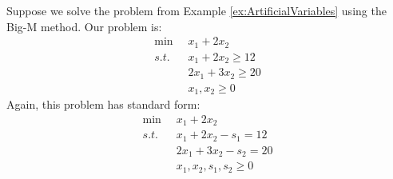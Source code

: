 \begin{example} 
Suppose we solve the problem from Example \ref{ex:ArtificialVariables} using the Big-M method. Our problem is:
\begin{equation}
\begin{aligned}
\min\;\; & 	x_1 + 2x_2\\
s.t.\;\; &	x_1 + 2x_2 \geq 12\\
		 &	2x_1 + 3x_2 \geq 20\\
		 &	x_1, x_2 \geq 0
\end{aligned}
\end{equation}
Again, this problem has standard form:
\begin{equation}
\begin{aligned}
\min\;\; & 	x_1 + 2x_2\\
s.t.\;\; &	x_1 + 2x_2 - s_1  = 12\\
		 &	2x_1 + 3x_2 - s_2 = 20\\
		 &	x_1, x_2, s_1, s_2 \geq 0
\end{aligned}
\end{equation}


\end{example}
